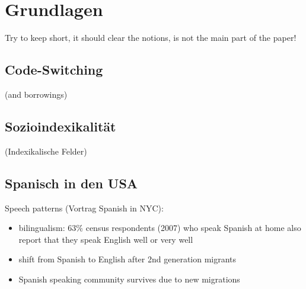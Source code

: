 \section{Grundlagen}

Try to keep short, it should clear the notions, is not the main part of the paper!

\subsection{Code-Switching}
(and borrowings)


\subsection{Sozioindexikalität}
(Indexikalische Felder)

\subsection{Spanisch in den USA}

Speech patterns (Vortrag Spanish in NYC):
\begin{itemize}
  \item bilingualism: 63\% census respondents (2007) who speak Spanish at home also report that they speak English well or very well
  \item shift from Spanish to English after 2nd generation migrants
  \item Spanish speaking community survives due to new migrations
\end{itemize}


\begin{comment}
Begriffe:
* code switching
(* borrowings)
* language shift
* Sozioindexikalität
* Indexical field?
* Medientheorie?
\end{comment}

